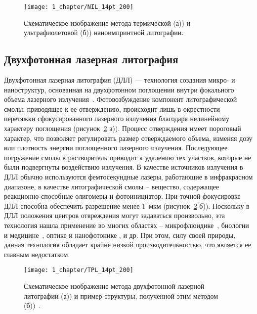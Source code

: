 \begin{figure}[t]
	\centering
	\texttt{[image: 1\_chapter/NIL\_14pt\_200]}
	\vspace{1em}
	\caption{Схематическое изображение метода термической (а)) и ультрафиолетовой (б)) наноимпринтной литографии.}
	\label{fig:NIL}
\end{figure}


\subsection{Двухфотонная лазерная литография}

Двухфотонная лазерная литография (ДЛЛ) — технология создания микро- и наноструктур, основанная на двухфотонном поглощении внутри фокального объема лазерного излучения~\cite{Hohmann2015, Kawata2001}. Фотовозбуждение компонент литографической смолы, приводящее к ее отверждению, происходит лишь в окрестности перетяжки сфокусированного лазерного излучения благодаря нелинейному характеру поглощения (рисунок~\ref{fig:TPL} а)). Процесс отверждения имеет пороговый характер, что позволяет регулировать размер отверждаемого объема, изменяя дозу или плотность энергии поглощенного лазерного излучения. Последующее погружение смолы в растворитель приводит к удалению тех участков, которые не были подвергнуты воздействию излучения. В качестве источников излучения в ДЛЛ обычно используются фемтосекундные лазеры, работающие в инфракрасном диапазоне, в качестве литографической смолы -- вещество, содержащее реакционно-способные олигомеры и фотоинициатор. При точной фокусировке ДЛЛ способна обеспечить разрешение менее 1~мкм (рисунок~\ref{fig:TPL} б)). Поскольку в ДЛЛ положения центров отвреждения могут задаваться произвольно, эта технология нашла применение во многих областях -- микрофлюидике~\cite{TPL_microfluidics_1, TPL_microfluidics_2}, биологии и \linebreak медицине~\cite{TPL_biology_1, TPL_biology_2}, оптике и нанофотонике \cite{TPL_optics, TPL_nanophotonics}, и др. При этом, силу своей природы, данная технология обладает крайне низкой производительностью, что является ее главным недостатком.

\begin{figure}[t]
	\centering
	\texttt{[image: 1\_chapter/TPL\_14pt\_200]}
	\vspace{1em}
	\caption{Схематическое изображение метода двухфотонной лазерной литографии (а)) и пример структуры, полученной этим методом (б))~\cite{TPL_castle}.}
	\label{fig:TPL}
\end{figure}


